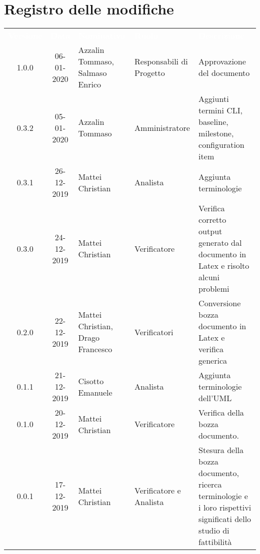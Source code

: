 \section*{Registro delle modifiche}
{
\renewcommand{\arraystretch}{1.5}
\centering
\begin{longtable}{ c c  C{4cm}  C{3cm} C{4cm}}
\textcolor{white}{\textbf{Versione}} & \textcolor{white}{\textbf{Data}} & \textcolor{white}{\textbf{Nominativo}} & \textcolor{white}{\textbf{Ruolo}} & \textcolor{white}{\textbf{Descrizione}}\\	


1.0.0 & 06-01-2020 & Azzalin Tommaso, Salmaso Enrico & Responsabili di Progetto & Approvazione del documento \\

0.3.2 & 05-01-2020 & Azzalin Tommaso & Amministratore & Aggiunti termini CLI, baseline, milestone, configuration item \\

0.3.1 & 26-12-2019 & Mattei Christian & Analista & Aggiunta terminologie \\

0.3.0 & 24-12-2019 & Mattei Christian & Verificatore & Verifica corretto output generato dal documento in Latex e risolto alcuni problemi\\

0.2.0 & 22-12-2019 & Mattei Christian, Drago Francesco & Verificatori &  Conversione bozza documento in Latex e verifica generica\\

0.1.1 & 21-12-2019 & Cisotto Emanuele & Analista & Aggiunta terminologie dell'UML \\
		
0.1.0 & 20-12-2019 & Mattei Christian & Verificatore & Verifica della bozza documento.  \\
		
0.0.1 & 17-12-2019 & Mattei Christian & Verificatore e Analista & Stesura della bozza documento, ricerca terminologie e i loro rispettivi significati dello studio di fattibilità \\
		
		
\end{longtable}
}